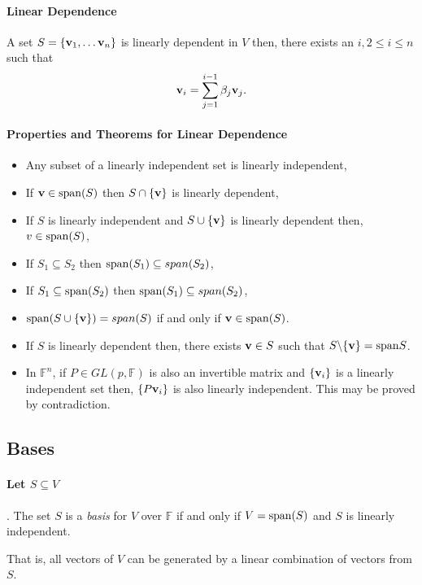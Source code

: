 \paragraph{Linear Dependence}
A set \(S = \{\mathbf{v}_1, \dots \mathbf{v}_n\}\) is  linearly dependent in \(V\) then,
there exists an \(i, 2\leq i \leq n\) 
such that 
\[
    \mathbf{v}_i = \sum_{j=1}^{i-1} \beta_j \mathbf{v}_j.
\]

\paragraph{Properties and Theorems for Linear Dependence}
\begin{itemize}
    \item Any subset of a linearly independent set is linearly independent,
    \item If \(\mathbf{v} \in \mathrm{span}(S)\) then \(S\cap \{\mathbf{v}\}\) is linearly dependent,
    \item If \(S\) is linearly independent and \(S\cup \{\mathbf{v}\}\)
    is linearly dependent then, \(v\in \mathrm{span}(S)\),
    \item If \(S_1 \subseteq S_2\) then \(\mathrm{span}(S_1) \subseteq span(S_2)\),
    \item If \(S_1 \subseteq \mathrm{span}(S_2)\) then
    \(\mathrm{span}(S_1) \subseteq span(S_2)\),
    \item \(\mathrm{span}(S\cup \{\mathbf{v}\}) = span(S)\) if and only if
    \(\mathbf{v} \in \mathrm{span}(S)\).
    \item If \(S\) is linearly dependent then, there exists \(\mathbf{v}\in S\)
    such that \(S\backslash\{\mathbf{v}\} = \mathrm{span}{S}\).
    \item In \(\mathbb{F}^n\), if \(P\in GL(p, \mathbb{F})\) is also
    an invertible matrix and \(\{\mathbf{v}_i\}\) is a linearly independent set
    then, \(\{P\mathbf{v}_i\}\) is also linearly independent. This may be proved
    by contradiction.
\end{itemize}

\subsection{Bases}

\paragraph{Let \(S\subseteq V\)}.
The set \(S\) is a \textit{basis} for \(V\) over \(\mathbb{F}\)
if and only if \(V = \mathrm{span}(S)\) and \(S\) is linearly independent.

That is, all vectors of \(V\) can be generated by a linear combination
of vectors from \(S\).

